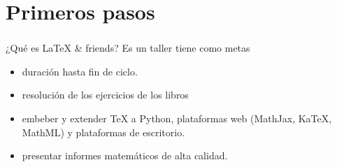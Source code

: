 
\setlength{\parskip}{\baselineskip} 
\section*{Primeros pasos}
\begin{frame}[t]
\frametitle{\insertsection}
\begin{block}{¿Qué es \LaTeX{} \& friends?}
	Es un taller tiene como metas
	\begin{itemize}
		\item duración hasta fin de ciclo.
	 	\item resolución de los ejercicios de los libros
	 	\item embeber y extender \TeX{} a Python, plataformas web (MathJax, Ka\TeX, MathML) y plataformas de escritorio.
	 	\item presentar informes matemáticos de alta calidad.
	 \end{itemize} 
\end{block}
\end{frame}

%
%
%



